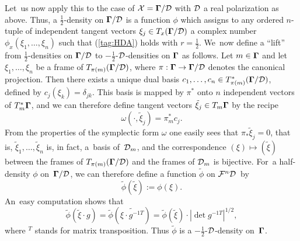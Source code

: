 \documentclass[12pt]{amsart}
\numberwithin{equation}{section}
\theoremstyle{remark}
\newcommand\Omg{{\bigam}}   %
\newcommand\FF{\Cal F}
\newcommand\DD{{\Cal D}}
\newcommand\MD{{\Omg/\DD}}
\newcommand\mhD{$-\tfrac12$-$\DD$}
\newcommand{\bigam}{\mbox{\boldmath $\Gamma$}}
\begin{document}
Let~us now apply this to the case of $\xX=\MD$ with $\DD$ a real polarization
as above. Thus, a $\frac12$-density on $\MD$ is a function $\phi$ which assigns
to any ordered $n$-tuple of independent tangent vectors $\xi_j\in T_x(\MD)$ a
complex number $\phi_x(\xi_1,\dots,\xi_n)$ such that (\ref{tag:HDA}) holds with
$r=\frac12$. We~now define a ``lift'' from $\frac12$-densities on $\MD$ to
\mhD-densities on $\Omg$ as follows. Let $m\in \Omg$ and let
$\xi_1,\dots,\xi_n$ be a frame of $T_{\pi(m)}(\MD)$, where $\pi:\Omg\to\MD$
denotes the canonical projection. Then there exists a unique dual basis
$c_1,\dots,c_n\in T^*_{\pi(m)}(\MD)$, defined by $c_j(\xi_k)=\delta_{jk}$. This
basis is mapped by $\pi^*$ onto $n$ independent vectors of $T^*_m \Omg$, and we
can therefore define tangent vectors $\tilde\xi_j\in T_m \Omg$ by the recipe
$$ \omega(\cdot,\tilde\xi_j)=\pi^*_m c_j.  $$
From the properties of the symplectic form $\omega$ one easily sees that
$\pi_*\tilde\xi_j=0$, that is, $\tilde\xi_1,\dots,\tilde\xi_n$ is, in fact,
a~basis of~$\DD_m$, and the correspondence $(\xi)\mapsto(\tilde\xi)$ between
the frames of $T_{\pi(m)}(\MD)$ and the frames of $\DD_m$ is bijective. For~a
half-density $\phi$ on~$\MD$, we can therefore define a function $\tilde\phi$
on $\FF^n\DD$~by
$$ \tilde\phi(\tilde\xi) := \phi(\xi).  $$
An~easy computation shows that
$$ \tilde\phi(\tilde\xi\cdot g) = \tilde\phi(\widetilde{\xi\cdot g^{-1T}})
= \tilde\phi(\tilde\xi) \cdot|\det g^{-1T}|^{1/2},  $$
where ${}^T$ stands for matrix transposition. Thus $\tilde\phi$ is a
\mhD-density on~$\Omg$.
\end{document}
